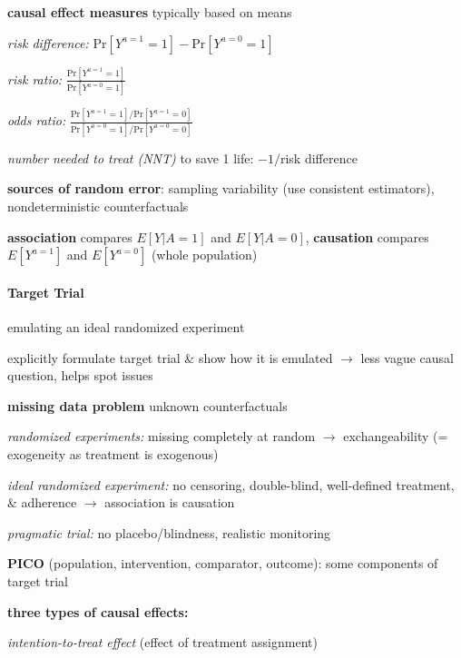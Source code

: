 \documentclass[8pt,twoside]{extarticle}
\renewcommand{\indent}{\hspace*{15pt}}
\begin{document}
\begin{multicols}{2}
  \textbf{causal effect measures} typically based on means

\indent \textit{risk difference:}  $\mathrm{Pr}\left[Y^{a=1}=1\right] - \mathrm{Pr}\left[Y^{a=0}=1\right]$

\indent \textit{risk ratio:} $\frac{\mathrm{Pr}\left[Y^{a=1}=1\right]}{ \mathrm{Pr}\left[Y^{a=0}=1\right]}$

\indent \textit{odds ratio:} $\frac{\mathrm{Pr}\left[Y^{a=1}=1\right]/\mathrm{Pr}\left[Y^{a=1}=0\right]}{ \mathrm{Pr}\left[Y^{a=0}=1\right]/\mathrm{Pr}\left[Y^{a=0}=0\right]}$

 \textit{number needed to treat (NNT)} to save 1 life: $-1/$risk difference

 \textbf{sources of random error}: sampling variability (use consistent estimators), nondeterministic counterfactuals

\textbf{association} compares $E\left[Y|A=1\right]$ and $E\left[Y|A=0\right]$, \textbf{causation} compares $E\left[Y^{a=1}\right]$ and $E\left[Y^{a=0}\right]$ (whole population)









\paragraph{Target Trial} emulating an ideal randomized experiment

 explicitly formulate target trial \& show how it is emulated $\rightarrow$ \newline less vague causal question, helps spot issues

 \textbf{missing data problem} unknown counterfactuals

 \textit{randomized experiments:} missing completely at random $\rightarrow$ exchangeability (= exogeneity as treatment is exogenous)

 \textit{ideal randomized experiment:} no censoring, double-blind, well-defined treatment, \& adherence $\rightarrow$ association is causation

 \textit{pragmatic trial:} no placebo/blindness, realistic monitoring


 \textbf{PICO} (population, intervention, comparator, outcome): some components of target trial

 \textbf{three types of causal effects:}

\indent \textit{intention-to-treat effect} (effect of treatment assignment)


\end{multicols}
\end{document}
